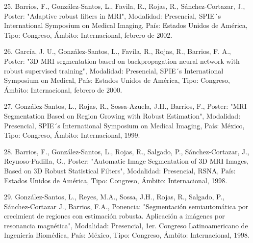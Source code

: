 25. Barrios, F., González-Santos, L., Favila, R., Rojas, R., Sánchez-Cortazar, J., Poster: "Adaptive 
robust filters in MRI", Modalidad: Presencial, SPIE´s International Symposium on Medical Imaging, 
País: Estados Unidos de América, Tipo: Congreso, Ámbito: Internacional, febrero de 2002.

26. García, J. U., González-Santos, L., Favila, R., Rojas, R., Barrios, F. A., Poster: "3D MRI 
segmentation based on backpropagation neural network with robust supervised training", Modalidad: 
Presencial, SPIE´s International Symposium on Medical, País: Estados Unidos de América, Tipo: 
Congreso, Ámbito: Internacional, febrero de 2000.

27. González-Santos, L., Rojas, R., Sossa-Azuela, J.H., Barrios, F., Poster: "MRI Segmentation Based 
on Region Growing with Robust Estimation", Modalidad: Presencial, SPIE´s International Symposium on 
Medical Imaging, País: México, Tipo: Congreso, Ámbito: Internacional, 1999.

28. Barrios, F., González-Santos, L., Rojas, R., Salgado, P., Sánchez-Cortazar, J., Reynoso-Padilla, 
G., Poster: "Automatic Image Segmentation of 3D MRI Images, Based on 3D Robust Statistical Filters", 
Modalidad: Presencial, RSNA, País: Estados Unidos de América, Tipo: Congreso, Ámbito: Internacional, 
1998.

29. González-Santos, L., Reyes, M.A., Sossa, J.H., Rojas, R., Salgado, P., Sánchez-Cortazar J., 
Barrios, F.A., Ponencia: "Segmentación semiautomática por crecimient de regiones con estimación 
robusta. Aplicación a imágenes por resonancia magnética", Modalidad: Presencial, 1er. Congreso 
Latinoamericano de Ingeniería Biomédica, País: México, Tipo: Congreso, Ámbito: Internacional, 1998.


